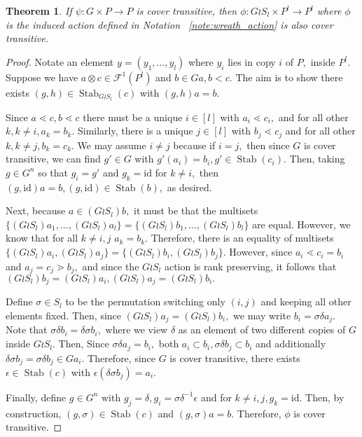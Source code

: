 \documentclass{amsart}
\newtheorem{thm}{Theorem}[subsection]
\theoremstyle{remark}
\newcommand{\id}{\mathrm{id}}
\def\Stab{\operatorname{Stab}}
\begin{document}
\begin{thm}
\label{thm:wreath_preservation}
If $\psi:G\times P \rightarrow P$ is cover transitive, then $\phi:G\wr S_l \times P^l \rightarrow P^l$ where $\phi$ is the induced action defined in Notation ~\ref{note:wreath_action} is also cover transitive.
\end{thm}
\begin{proof}

Notate an element $y = (y_1,\ldots, y_l)$ where $y_i$ lies in copy $i$ of $P,$ inside $P^l.$ Suppose we have $a \otimes c \in \mathcal F^1(P^l)$ and $b \in Ga,b < c.$ The aim is to show there exists $(g,h) \in \Stab_{G\wr S_l}(c)$ with $(g,h)a = b.$ 

Since $a \lessdot c, b \lessdot c$ there must be a unique $i \in [l]$ with $a_i \lessdot c_i,$ and for all other $k,k\neq i,a_k = b_k.$ Similarly, there is a unique $j \in [l]$ with $b_j \lessdot c_j$ and for all other $k,k\neq j,b_k = c_k.$ We may assume $i \neq j$  because if $i = j,$ then since $G$ is cover transitive, we can find $g' \in G$ with $g'(a_i) = b_i,g' \in \Stab(c_i).$ Then, taking $g \in G^n$ so that $g_i = g'$ and $g_k = \id$ for $k \neq i,$ then $(g,\id)a = b,(g,\id) \in \Stab(b),$ as desired.

Next, because $a \in (G\wr S_l)b,$ it must be that the multisets $\{(G \wr S_l)a_1,\ldots, (G \wr S_l)a_l\}=\{(G \wr S_l)b_1,\ldots, (G \wr S_l)b_l\}$ are equal. However, we know that for all $k \neq i,j$ $a_k = b_k$. Therefore, there is an equality of multisets $\{(G \wr S_l)a_i,(G \wr S_l)a_j\} = \{(G \wr S_l)b_i,(G \wr S_l)b_j\}.$ However, since $a_i \lessdot c_i = b_i$ and $a_j = c_j \gtrdot b_j,$ and since the $G\wr S_l$ action is rank preserving, it follows that $(G \wr S_l)b_j=(G \wr S_l)a_i, (G \wr S_l)a_j = (G \wr S_l)b_i.$

Define $\sigma \in S_l$ to be the permutation switching only $(i,j)$ and keeping all other elements fixed. Then, since $(G \wr S_l)a_j = (G \wr S_l)b_i,$ we may write $b_i = \sigma\delta a_j.$ 
Note that $\sigma \delta b_i = \delta \sigma b_i,$ where we view $\delta$ as an element of two different copies of $G$ inside $G \wr S_l.$ Then,
Since $\sigma \delta a_j = b_i,$ both $a_i \subset b_i,\sigma \delta b_j \subset b_i$ and additionally $\delta\sigma b_j = \sigma\delta b_j \in Ga_i.$ Therefore, since $G$ is cover transitive, there exists $\epsilon \in \Stab(c)$ with $\epsilon(\delta\sigma b_j) = a_i.$

Finally, define $g \in G^n$ with $g_j = \delta,g_i = \sigma\delta^{-1}\epsilon$ and for $k \neq i,j,g_k = \id.$ Then, by construction, $(g,\sigma) \in \Stab (c)$ and $(g,\sigma)a = b.$ Therefore, $\phi$ is cover transitive.
\end{proof}
\end{document}
